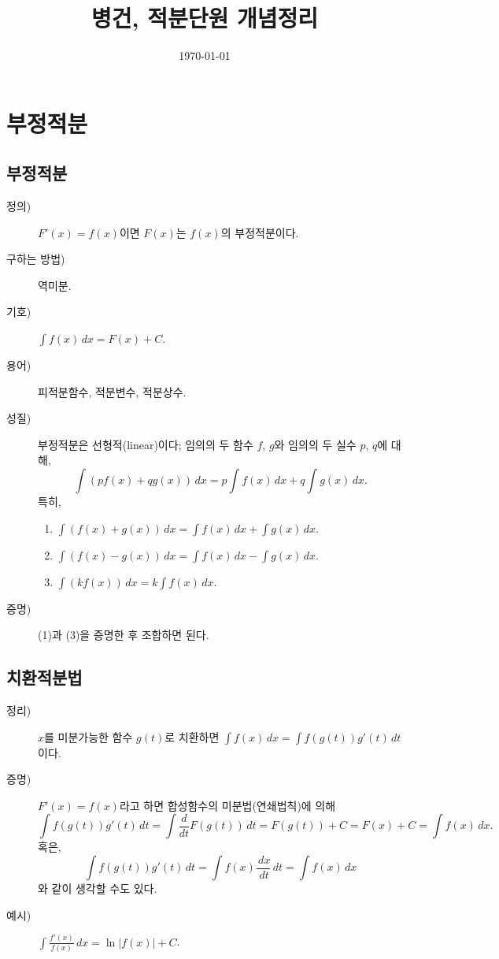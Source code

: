\documentclass{oblivoir}
\newcommand{\bd}{\begin{description}}
\newcommand{\ed}{\end{description}}
\newcommand{\dx}{\ensuremath{\,dx}}
\newcommand{\dt}{\ensuremath{\,dt}}
\begin{document}
\title{병건, 적분단원 개념정리}
\author{}
\date{\today}
\maketitle
\tableofcontents

\newpage


\section{부정적분}

\subsection{부정적분}
\bd
\item[정의)]
\(F'(x)=f(x)\)이면 \(F(x)\)는 \(f(x)\)의 부정적분이다.
\item[구하는 방법)]
역미분.
\item[기호)]
\(\int f(x)\,dx=F(x)+C\).
\item[용어)]
피적분함수, 적분변수, 적분상수.
\item[성질)]
부정적분은 선형적(linear)이다; 임의의 두 함수 \(f\), \(g\)와 임의의 두 실수 \(p\), \(q\)에 대해, \[\int(pf(x)+qg(x))\,dx=p\int f(x)\,dx+q\int g(x)\,dx.\]
특히,
\begin{enumerate}[(1)]\tightlist
\item
\(\int(f(x)+g(x))\,dx=\int f(x)\,dx+\int g(x)\,dx\).
\item
\(\int(f(x)-g(x))\,dx=\int f(x)\,dx-\int g(x)\,dx\).
\item
\(\int(kf(x))\,dx=k\int f(x)\,dx\).
\end{enumerate}
\item[증명)]
(1)과 (3)을 증명한 후 조합하면 된다.
\ed

\subsection{치환적분법}
\bd
\item[정리)]
\(x\)를 미분가능한 함수 \(g(t)\)로 치환하면 \(\int f(x)\,dx=\int f(g(t))g'(t)\,dt\)이다.
\item[증명)]
\(F'(x)=f(x)\)라고 하면 합성함수의 미분법(연쇄법칙)에 의해%
\[
\int f(g(t))g'(t)\,dt=\int\frac d{dt}F(g(t))\,dt=F(g(t))+C=F(x)+C=\int f(x)\,dx.
\]
혹은,
\[
\int f(g(t))g'(t)\,dt=\int f(x)\frac{\dx}{\dt}\,dt=\int f(x)\,dx
\]
와 같이 생각할 수도 있다.
\item[예시)]
\(\int\frac{f'(x)}{f(x)}\,dx=\ln{|f(x)|}+C\).
\ed
\end{document}
